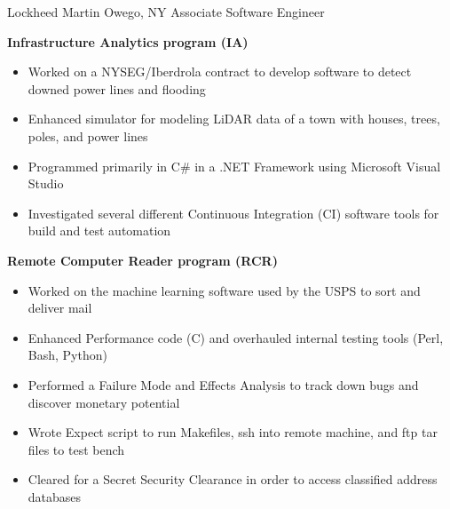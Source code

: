 
        {Lockheed Martin}
        {Owego, NY}
        {Associate Software Engineer}
        {}{
    \textbf{Infrastructure Analytics program (IA)}
    \begin{itemize}
        \item Worked on a NYSEG/Iberdrola contract to develop software to detect downed power lines and flooding
        \item Enhanced simulator for modeling LiDAR data of a town with houses, trees, poles, and power lines
        \item Programmed primarily in C\# in a .NET Framework using Microsoft Visual Studio
        \item Investigated several different Continuous Integration (CI) software tools for build and test automation
    \end{itemize}
    \textbf{Remote Computer Reader program (RCR)}
    \begin{itemize}
        \item Worked on the machine learning software used by the USPS to sort and deliver mail
        \item Enhanced Performance code (C) and overhauled internal testing tools (Perl, Bash, Python)
        \item Performed a Failure Mode and Effects Analysis to track down bugs and discover monetary potential
        \item Wrote Expect script to run Makefiles, ssh into remote machine, and ftp tar files to test bench
        \item Cleared for a Secret Security Clearance in order to access classified address databases
    \end{itemize}
}
